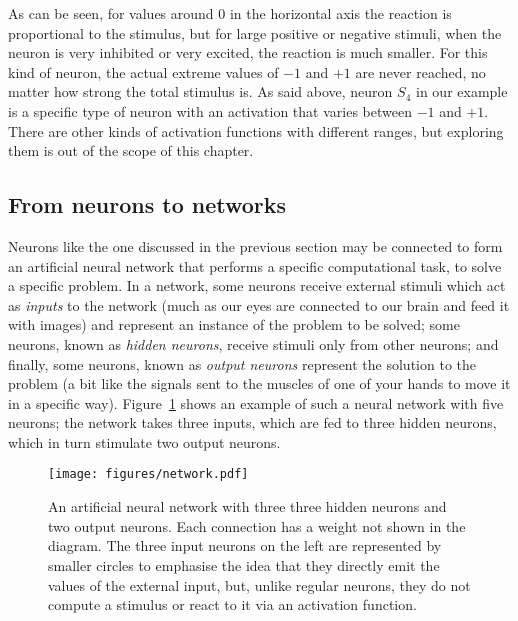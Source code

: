\documentclass[output=paper,colorlinks,citecolor=brown]{langscibook}
\begin{document}
As can be seen, for values around $0$ in the horizontal axis the reaction is proportional to the stimulus, but for large positive or negative stimuli, when the neuron is very inhibited or very excited, the reaction is much smaller. 
For this kind of neuron, the
actual extreme values of $-1$ and $+1$ are never reached, no matter how strong the total stimulus is. 
As said above, neuron
$S_4$ in our example is a specific type of neuron 
with an activation that varies between $-1$ and $+1$. There are other kinds of activation functions with different ranges, but exploring them is out of the scope of this chapter.


\subsection{From neurons to networks}
\label{ss:ann}

Neurons like the one discussed in the previous section may be connected to form an artificial neural network that performs a specific computational task, to solve a specific problem. In a network, some neurons receive external stimuli which act as \emph{inputs} to the network (much as our eyes are connected to our brain and feed it with images) and represent an instance of the problem to be solved; some neurons, known as \emph{hidden neurons}, receive stimuli only from other neurons; and finally, some neurons, known as \emph{output neurons} represent the solution to the problem (a bit like the signals sent to the muscles of one of your hands to move it in a specific way). Figure~\ref{fg:nn} shows an example of such a neural network with five neurons; the network takes three inputs, which are fed to three hidden neurons, which in turn stimulate two output neurons.

\begin{figure}[tb]
    \centering
    \texttt{[image: figures/network.pdf]}
    \caption{An artificial neural network with 
    three
    three
    hidden neurons and 
    two
    output neurons. Each connection has a weight not shown in the diagram. 
    The three input neurons on the left are represented by smaller circles to emphasise the idea that they directly emit the values of the external input, but, unlike regular neurons, they do not compute a stimulus or react to it via an activation function.}
    \label{fg:nn}
\end{figure}
 
\end{document}
